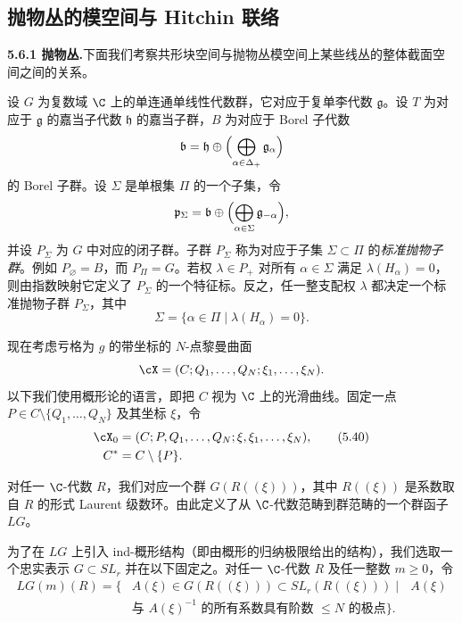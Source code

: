 
\subsection{抛物丛的模空间与 Hitchin 联络}


\noindent\textbf{5.6.1 抛物丛.}\quad 下面我们考察共形块空间与抛物丛模空间上某些线丛的整体截面空间之间的关系。


设 $G$ 为复数域 $\C$ 上的单连通单线性代数群，它对应于复单李代数 $\mathfrak g$。设 $T$ 为对应于 $\mathfrak g$ 的嘉当子代数 $\mathfrak h$ 的嘉当子群，$B$ 为对应于 Borel 子代数
\[
 \mathfrak b=\mathfrak h\oplus\Bigl(\bigoplus_{\alpha\in\Delta_+}\mathfrak g_\alpha\Bigr)
\]
的 Borel 子群。设 $\Sigma$ 是单根集 $\Pi$ 的一个子集，令
\[
 \mathfrak p_\Sigma=\mathfrak b\oplus\Bigl(\bigoplus_{\alpha\in\Sigma}\mathfrak g_{-\alpha}\Bigr),
\]
并设 $P_\Sigma$ 为 $G$ 中对应的闭子群。子群 $P_\Sigma$ 称为对应于子集 $\Sigma\subset\Pi$ 的\emph{标准抛物子群}。例如 $P_\varnothing=B$，而 $P_\Pi=G$。若权 $\lambda\in P_+$ 对所有 $\alpha\in\Sigma$ 满足 $\lambda(H_\alpha)=0$，则由指数映射它定义了 $P_\Sigma$ 的一个特征标。反之，任一整支配权 $\lambda$ 都决定一个标准抛物子群 $P_\Sigma$，其中
\[
 \Sigma=\{\alpha\in\Pi\mid\lambda(H_\alpha)=0\}.
\]


现在考虑亏格为 $g$ 的带坐标的 $N$-点黎曼曲面
\[
 \cX=(C;Q_1,\dots,Q_N;\xi_1,\dots,\xi_N).
\]
以下我们使用概形论的语言，即把 $C$ 视为 $\C$ 上的光滑曲线。固定一点 $P\in C\setminus\{Q_1,\dots,Q_N\}$ 及其坐标 $\xi$，令
\begin{align}
 \cX_0&=(C;P,Q_1,\dots,Q_N;\xi,\xi_1,\dots,\xi_N), \tag{5.40}\\
 C^*&=C\setminus\{P\}. \nonumber
\end{align}

对任一 $\C$-代数 $R$，我们对应一个群 $G(R((\xi)))$，其中 $R((\xi))$ 是系数取自 $R$ 的形式 Laurent 级数环。由此定义了从 $\C$-代数范畴到群范畴的一个群函子 $LG$。

为了在 $LG$ 上引入 ind-概形结构（即由概形的归纳极限给出的结构），我们选取一个忠实表示 $G\subset SL_r$ 并在以下固定之。对任一 $\C$-代数 $R$ 及任一整数 $m\ge 0$，令
\begin{align}
 LG(m)(R)=\bigl\{&A(\xi)\in G(R((\xi)))\subset SL_r(R((\xi)))\mid\text{ $A(\xi)$} \nonumber\\
 &\text{与 $A(\xi)^{-1}$ 的所有系数具有阶数 $\le N$ 的极点}\bigr\}. \nonumber
\end{align}

